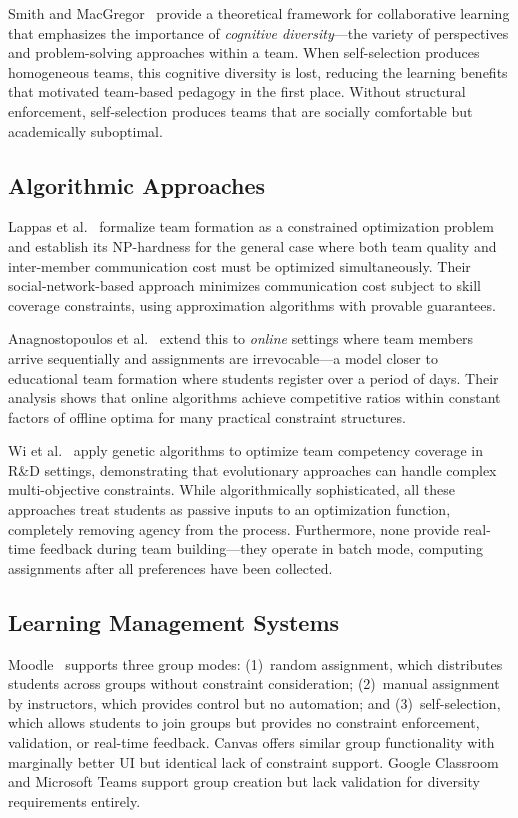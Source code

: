 \documentclass[conference]{IEEEtran}
\begin{document}
Smith and MacGregor~\cite{smith1992} provide a theoretical framework for collaborative learning that emphasizes the importance of \textit{cognitive diversity}---the variety of perspectives and problem-solving approaches within a team. When self-selection produces homogeneous teams, this cognitive diversity is lost, reducing the learning benefits that motivated team-based pedagogy in the first place. Without structural enforcement, self-selection produces teams that are socially comfortable but academically suboptimal.

\subsection{Algorithmic Approaches}

Lappas et al.~\cite{lappas2009} formalize team formation as a constrained optimization problem and establish its NP-hardness for the general case where both team quality and inter-member communication cost must be optimized simultaneously. Their social-network-based approach minimizes communication cost subject to skill coverage constraints, using approximation algorithms with provable guarantees.

Anagnostopoulos et al.~\cite{anagnostopoulos2012} extend this to \textit{online} settings where team members arrive sequentially and assignments are irrevocable---a model closer to educational team formation where students register over a period of days. Their analysis shows that online algorithms achieve competitive ratios within constant factors of offline optima for many practical constraint structures.

Wi et al.~\cite{wi2009} apply genetic algorithms to optimize team competency coverage in R\&D settings, demonstrating that evolutionary approaches can handle complex multi-objective constraints. While algorithmically sophisticated, all these approaches treat students as passive inputs to an optimization function, completely removing agency from the process. Furthermore, none provide real-time feedback during team building---they operate in batch mode, computing assignments after all preferences have been collected.

\subsection{Learning Management Systems}

Moodle~\cite{moodle} supports three group modes: (1)~random assignment, which distributes students across groups without constraint consideration; (2)~manual assignment by instructors, which provides control but no automation; and (3)~self-selection, which allows students to join groups but provides no constraint enforcement, validation, or real-time feedback. Canvas offers similar group functionality with marginally better UI but identical lack of constraint support. Google Classroom and Microsoft Teams support group creation but lack validation for diversity requirements entirely.
\end{document}
